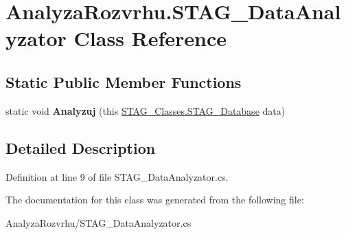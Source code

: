 \hypertarget{class_analyza_rozvrhu_1_1_s_t_a_g___data_analyzator}{}\section{Analyza\+Rozvrhu.\+S\+T\+A\+G\+\_\+\+Data\+Analyzator Class Reference}
\label{class_analyza_rozvrhu_1_1_s_t_a_g___data_analyzator}
\subsection*{Static Public Member Functions}
\begin{DoxyCompactItemize}
\item 
\mbox{\label{class_analyza_rozvrhu_1_1_s_t_a_g___data_analyzator_a2842d07871b9b0387bb817e1cc30444d}} 
static void {\bfseries Analyzuj} (this \hyperlink{class_analyza_rozvrhu_1_1_s_t_a_g___classes_1_1_s_t_a_g___database}{S\+T\+A\+G\+\_\+\+Classes.\+S\+T\+A\+G\+\_\+\+Database} data)
\end{DoxyCompactItemize}


\subsection{Detailed Description}


Definition at line 9 of file S\+T\+A\+G\+\_\+\+Data\+Analyzator.\+cs.



The documentation for this class was generated from the following file\+:\begin{DoxyCompactItemize}
\item 
Analyza\+Rozvrhu/S\+T\+A\+G\+\_\+\+Data\+Analyzator.\+cs\end{DoxyCompactItemize}
